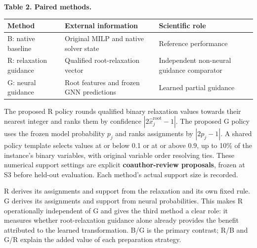 \documentclass[
  british,
  10pt,
]{article}
\newcounter{none} %
\begin{document}

\textbf{Table 2. Paired methods.}

{\def\LTcaptype{none} %
\begin{longtable}[]{@{}
  >{\raggedright\arraybackslash}p{}
  >{\raggedright\arraybackslash}p{}
  >{\raggedright\arraybackslash}p{}@{}}
\toprule\noalign{}
\begin{minipage}[b]{\linewidth}\raggedright
Method
\end{minipage} & \begin{minipage}[b]{\linewidth}\raggedright
External information
\end{minipage} & \begin{minipage}[b]{\linewidth}\raggedright
Scientific role
\end{minipage} \\
\midrule\noalign{}
\endhead
\bottomrule\noalign{}
\endlastfoot
B: native baseline & Original MILP and native solver state & Reference
performance \\
R: relaxation guidance & Qualified root-relaxation vector & Independent
non-neural guidance comparator \\
G: neural guidance & Root features and frozen GNN predictions & Learned
partial guidance \\
\end{longtable}
}

The proposed R policy rounds qualified binary relaxation values towards
their nearest integer and ranks them by confidence
\(|2\widehat x_j^{\mathrm{root}}-1|\). The proposed G policy uses the
frozen model probability \(p_j\) and ranks assignments by \(|2p_j-1|\).
A shared policy template selects values at or below 0.1 or at or above
0.9, up to 10\% of the instance's binary variables, with original
variable order resolving ties. These numerical support settings are
explicit \textbf{coauthor-review proposals}, frozen at S3 before
held-out evaluation. Each method's actual support size is recorded.

R derives its assignments and support from the relaxation and its own
fixed rule. G derives its assignments and support from neural
probabilities. This makes R operationally independent of G and gives the
third method a clear role: it measures whether root-relaxation guidance
alone already provides the benefit attributed to the learned
transformation. B/G is the primary contrast; R/B and G/R explain the
added value of each preparation strategy.
\end{document}
